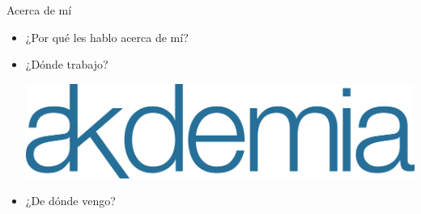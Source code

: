 \begin{frame}{Acerca de mí}
  \begin{itemize}
    \item ¿Por qué les hablo acerca de mí? \pause
    \item ¿Dónde trabajo?

      \vspace{0.25cm}
      \begin{center}
        \includegraphics[scale=0.2]{img/akdemia} \pause
      \end{center}
    \item ¿De dónde vengo?


\end{itemize}
\end{frame}
